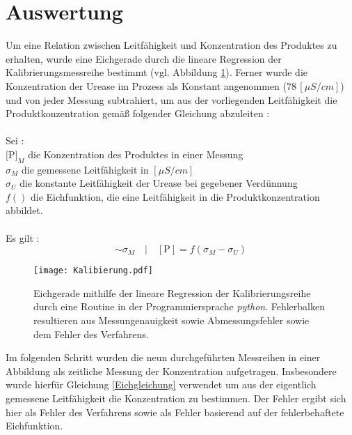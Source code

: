 %
%
\setlength\abovedisplayshortskip{20pt}
\setlength\belowdisplayshortskip{20pt}
\setlength\abovedisplayskip{20pt}
\setlength\belowdisplayskip{20pt}
\section {Auswertung}
Um eine Relation zwischen Leitfähigkeit und Konzentration des Produktes zu erhalten, wurde eine Eichgerade durch die lineare Regression der Kalibrierungsmessreihe bestimmt (vgl. Abbildung \ref{Eichgerade}). Ferner wurde die Konzentration der Urease im Prozess als Konstant angenommen ($ 78\,[\si{\mu S/cm}]$) und von jeder Messung subtrahiert, um aus der vorliegenden Leitfähigkeit die Produktkonzentration gemäß folgender Gleichung abzuleiten : \\
\\
Sei : \\
 $[$P$]_M$ die Konzentration des Produktes in einer Messung\\
 $\sigma_M$ die gemessene Leitfähigkeit in $[\si{\mu S/cm}]$\\
  $\sigma_U$ die konstante Leitfähigkeit der Urease bei gegebener Verdünnung \\
  $f()$ die Eichfunktion, die eine Leitfähigkeit in die Produktkonzentration abbildet.\\
  \\
  Es gilt :
\begin{equation}
[\text{P}]  \sim \sigma_M \quad| \quad [\text{P}]=f(\sigma_M-\sigma_U)
\label{Eichgleichung}
\end{equation}
\begin{figure}[H]
	\centering	
	\begin{minipage}{1\textwidth}
		\texttt{[image: Kalibierung.pdf]}
	\end{minipage}
	\caption{Eichgerade mithilfe der lineare Regression der Kalibrierungsreihe durch eine Routine in der Programmiersprache \textit{python}. Fehlerbalken resultieren aus Messungenauigkeit sowie Abmessungsfehler sowie dem Fehler des Verfahrens.}
	\label{Eichgerade}
\end{figure}
Im folgenden Schritt wurden die neun durchgeführten Messreihen in einer Abbildung als zeitliche Messung der Konzentration aufgetragen. Insbesondere wurde hierfür Gleichung \ref{Eichgleichung} verwendet um aus der eigentlich gemessene Leitfähigkeit die Konzentration zu bestimmen. Der Fehler ergibt sich hier als Fehler des Verfahrens sowie als Fehler basierend auf der fehlerbehaftete Eichfunktion.
